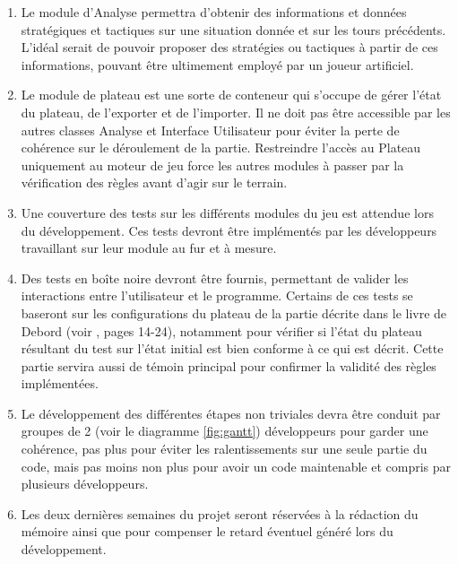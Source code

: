 \documentclass[a4paper]{report}
\begin{document}
\begin{enumerate}

\item Le module d'Analyse permettra d'obtenir des informations et données stratégiques et tactiques sur une situation donnée et sur les tours précédents. L'idéal serait de pouvoir proposer des stratégies ou tactiques à partir de ces informations, pouvant être ultimement employé par un joueur artificiel.

\item Le module de plateau est une sorte de conteneur qui s'occupe de gérer l'état du plateau, de l'exporter et de l'importer. Il ne doit pas être accessible par les autres classes Analyse et Interface Utilisateur pour éviter la perte de cohérence sur le déroulement de la partie. Restreindre l'accès au Plateau uniquement au moteur de jeu force les autres modules à passer par la vérification des règles avant d'agir sur le terrain.

\item Une couverture des tests sur les différents modules du jeu est attendue lors du développement. Ces tests devront être implémentés par les développeurs travaillant sur leur module au fur et à mesure.

\item Des tests en boîte noire devront être fournis, permettant de valider les interactions entre l'utilisateur et le programme. Certains de ces tests se baseront sur les configurations du plateau de la partie décrite dans le livre de Debord (voir \cite{jdg}, pages 14-24), notamment pour vérifier si l'état du plateau résultant du test sur l'état initial est bien conforme à ce qui est décrit. Cette partie servira aussi de témoin principal pour confirmer la validité des règles implémentées.

\item Le développement des différentes étapes non triviales devra être conduit par groupes de 2 (voir le diagramme \ref{fig:gantt}) développeurs pour garder une cohérence, pas plus pour éviter les ralentissements sur une seule partie du code, mais pas moins non plus pour avoir un code maintenable et compris par plusieurs développeurs.

\item Les deux dernières semaines du projet seront réservées à la rédaction du mémoire ainsi que pour compenser le retard éventuel généré lors du développement.
\end{enumerate}
\end{document}
